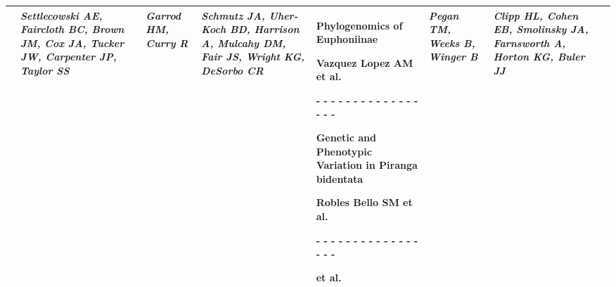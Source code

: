 \begin{tabular}{|x{0.8cm}|x{2.65cm}|x{2.65cm}|a{2.65cm}|x{2.65cm}|x{2.65cm}|x{2.65cm}|@{}m{0pt}@{}}
& \par \vspace{8pt} \textit{Settlecowski AE, Faircloth BC, Brown JM, Cox JA, Tucker JW, Carpenter JP, Taylor SS} &  \par \vspace{8pt} \textit{Garrod HM, Curry R} &  \par \vspace{8pt} \textit{Schmutz JA, Uher-Koch BD, Harrison A, Mulcahy DM, Fair JS, Wright KG, DeSorbo CR} & \scriptsize Phylogenomics of Euphoniinae\par \tiny Vazquez Lopez AM et al. \par - - - - - - - - - - - - - - - - - \par \vspace{2pt} \scriptsize Genetic and Phenotypic Variation in Piranga bidentata\par \tiny Robles Bello SM et al. \par - - - - - - - - - - - - - - - - - \par \vspace{2pt} \scriptsize \par \tiny  et al.  &  \par \vspace{8pt} \textit{Pegan TM, Weeks B, Winger B} &  \par \vspace{8pt} \textit{Clipp HL, Cohen EB, Smolinsky JA, Farnsworth A, Horton KG, Buler JJ}&\\[25ex]
\hline

\end{tabular}
